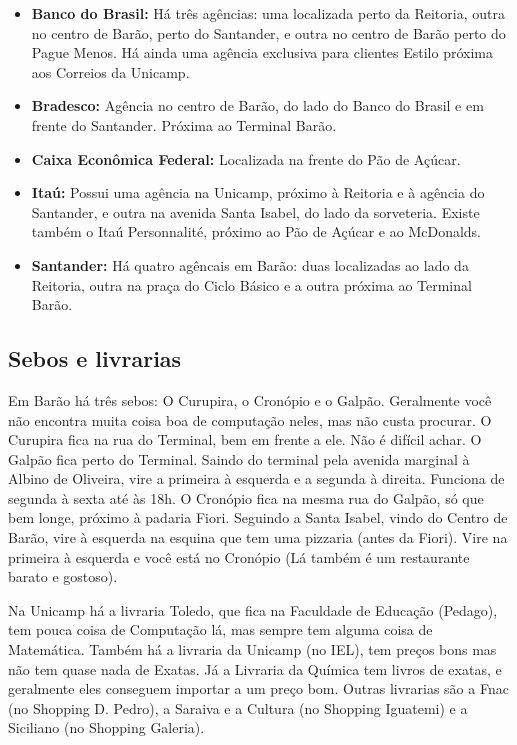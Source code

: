\begin{itemize}
    \item  \textbf{Banco do Brasil:} Há três agências: uma localizada perto da
        Reitoria, outra no centro de Barão, perto do Santander, e outra no
        centro de Barão perto do Pague Menos. Há ainda uma agência exclusiva
        para clientes Estilo próxima aos Correios da Unicamp.

    \item  \textbf{Bradesco:} Agência no centro de Barão, do lado do Banco do
        Brasil e em frente do Santander. Próxima ao Terminal Barão.

    \item  \textbf{Caixa Econômica Federal:} Localizada na frente do Pão de
        Açúcar.

    \item  \textbf{Itaú:} Possui uma agência na Unicamp, próximo à Reitoria e à
        agência do Santander, e outra na avenida Santa Isabel, do lado da
        sorveteria. Existe também o Itaú Personnalité, próximo ao Pão de Açúcar e
        ao McDonalds.

    \item  \textbf{Santander:} Há quatro agêncais em Barão: duas localizadas ao
        lado da Reitoria, outra na praça do Ciclo Básico e a outra próxima ao
        Terminal Barão.
\end{itemize}

\subsection{Sebos e livrarias}

Em Barão há três sebos: O Curupira, o Cronópio e o Galpão. Geralmente você não
encontra muita coisa boa de computação neles, mas não custa procurar. O Curupira
fica na rua do Terminal, bem em frente a ele. Não é difícil achar. O Galpão fica
perto do Terminal. Saindo do terminal pela avenida marginal à Albino de
Oliveira, vire a primeira à esquerda e a segunda à direita. Funciona de segunda
à sexta até às 18h. O Cronópio fica na mesma rua do Galpão, só que bem longe,
próximo à padaria Fiori. Seguindo a Santa Isabel, vindo do Centro de Barão, vire
à esquerda na esquina que tem uma pizzaria (antes da Fiori). Vire na primeira à
esquerda e você está no Cronópio (Lá também é um restaurante barato e gostoso).

Na Unicamp há a livraria Toledo, que fica na Faculdade de Educação (Pedago), tem
pouca coisa de Computação lá, mas sempre tem alguma coisa de Matemática. Também
há a livraria da Unicamp (no IEL), tem preços bons mas não tem quase nada de
Exatas. Já a Livraria da Química tem livros de exatas, e geralmente eles
conseguem importar a um preço bom. Outras livrarias são a Fnac (no Shopping D.
Pedro), a Saraiva e a Cultura (no Shopping Iguatemi) e a Siciliano (no Shopping
Galeria).

